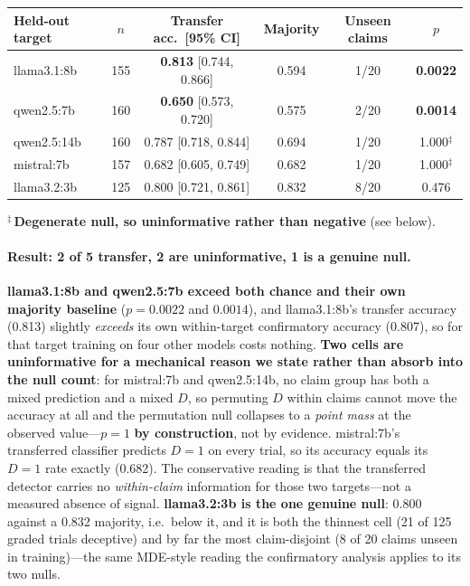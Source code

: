 \begin{center}
\begin{scriptsize}
\setlength{\tabcolsep}{5pt}
\begin{tabular}{@{}lccccc@{}}
\toprule
\textbf{Held-out target} & $n$ & \textbf{Transfer acc.\ [95\% CI]} & \textbf{Majority} & \textbf{Unseen claims} & $p$ \\
\midrule
llama3.1:8b  & 155 & \textbf{0.813} [0.744, 0.866] & 0.594 & 1/20 & \textbf{0.0022} \\
qwen2.5:7b   & 160 & \textbf{0.650} [0.573, 0.720] & 0.575 & 2/20 & \textbf{0.0014} \\
\addlinespace[2pt]
qwen2.5:14b  & 160 & 0.787 [0.718, 0.844] & 0.694 & 1/20 & 1.000$^{\ddagger}$ \\
mistral:7b   & 157 & 0.682 [0.605, 0.749] & 0.682 & 1/20 & 1.000$^{\ddagger}$ \\
llama3.2:3b  & 125 & 0.800 [0.721, 0.861] & 0.832 & 8/20 & 0.476 \\
\bottomrule
\end{tabular}
\end{scriptsize}

\begin{scriptsize}
$^{\ddagger}$\,\textbf{Degenerate null, so uninformative rather than negative} (see below).
\end{scriptsize}
\end{center}

\paragraph{Result: 2 of 5 transfer, 2 are uninformative, 1 is a genuine null.} \textbf{llama3.1:8b and qwen2.5:7b exceed both chance and their own majority baseline} ($p\!=\!0.0022$ and $0.0014$), and llama3.1:8b's transfer accuracy (0.813) slightly \emph{exceeds} its own within-target confirmatory accuracy (0.807), so for that target training on four other models costs nothing. \textbf{Two cells are uninformative for a mechanical reason we state rather than absorb into the null count}: for mistral:7b and qwen2.5:14b, no claim group has both a mixed prediction and a mixed $D$, so permuting $D$ within claims cannot move the accuracy at all and the permutation null collapses to a \emph{point mass} at the observed value---$p\!=\!1$ \textbf{by construction}, not by evidence. mistral:7b's transferred classifier predicts $D\!=\!1$ on every trial, so its accuracy equals its $D\!=\!1$ rate exactly (0.682). The conservative reading is that the transferred detector carries no \emph{within-claim} information for those two targets---not a measured absence of signal. \textbf{llama3.2:3b is the one genuine null}: 0.800 against a 0.832 majority, i.e.\ below it, and it is both the thinnest cell (21 of 125 graded trials deceptive) and by far the most claim-disjoint (8 of 20 claims unseen in training)---the same MDE-style reading the confirmatory analysis applies to its two nulls.

